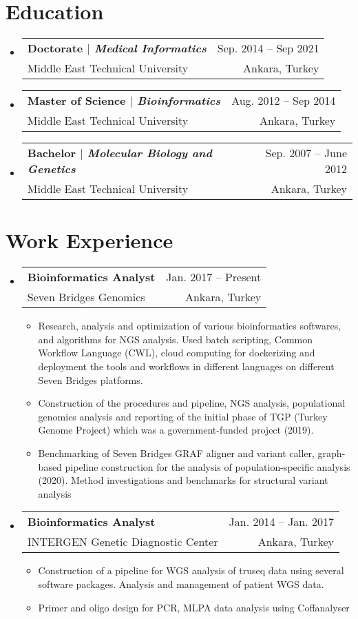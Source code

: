 \documentclass[A4,11pt]{article}
\makeatletter
\newcommand{\CVItem}[1]{
  \item\small{
    {#1 \vspace{-2pt}}
  }
}
\newcommand{\CVSubheading}[4]{
  \vspace{-2pt}\item
    \begin{tabular*}{0.97\textwidth}[t]{l@{\extracolsep{\fill}}r}
      \textbf{#1} & #2 \\
      \small#3 & \small #4 \\
    \end{tabular*}\vspace{-7pt}
}
\newcommand{\CVSubHeadingListStart}{\begin{itemize}[leftmargin=0.5cm, label={}]}
\newcommand{\CVSubHeadingListEnd}{\end{itemize}}
\newcommand{\CVItemListStart}{\begin{itemize}}
\newcommand{\CVItemListEnd}{\end{itemize}\vspace{-5pt}}
\makeatother
\begin{document}
\section{Education}
  \CVSubHeadingListStart
    \CVSubheading
      {{Doctorate $|$ \emph{\small{Medical Informatics}}}}{Sep. 2014 -- Sep 2021}
      {Middle East Technical University}{Ankara, Turkey}
    \CVSubheading
      {{Master of Science $|$ \emph{\small{Bioinformatics}}}}{Aug. 2012 -- Sep 2014}
      {Middle East Technical University}{Ankara, Turkey}
    \CVSubheading
      {{Bachelor $|$ \emph{\small{Molecular Biology and Genetics}}}}{Sep. 2007 -- June 2012}
      {Middle East Technical University}{Ankara, Turkey}
  \CVSubHeadingListEnd

\begin{comment}
try to briefly explain what you did and why it is relevant to the position you
are seeking
\end{comment}

\section{Work Experience}
  \CVSubHeadingListStart
    \CVSubheading
      {Bioinformatics Analyst}{Jan. 2017 -- Present}
      {Seven Bridges Genomics}{Ankara, Turkey}
      \CVItemListStart
        \CVItem{Research, analysis and optimization of various bioinformatics softwares, and algorithms for NGS analysis. Used batch scripting, Common Workflow Language (CWL), cloud computing for dockerizing and deployment the tools and workflows in different languages on different Seven Bridges platforms. }
        \CVItem{Construction of the procedures and pipeline, NGS analysis, populational genomics analysis and reporting of the initial phase of TGP (Turkey Genome Project) which was a government-funded project (2019). }
        \CVItem{Benchmarking of Seven Bridges GRAF aligner and variant caller, graph-based pipeline construction for the analysis of population-specific analysis (2020). Method investigations and benchmarks for structural variant analysis}
      \CVItemListEnd
    \CVSubheading
      {Bioinformatics Analyst}{Jan. 2014 -- Jan. 2017}
      {INTERGEN Genetic Diagnostic Center}{Ankara, Turkey}
      \CVItemListStart
        \CVItem{ Construction of a pipeline for WGS analysis of truseq data using several software packages. Analysis and management of patient WGS data.}
        \CVItem{Primer and oligo design for PCR, MLPA data analysis using Coffanalyser}
      \CVItemListEnd
  \CVSubHeadingListEnd
\end{document}
